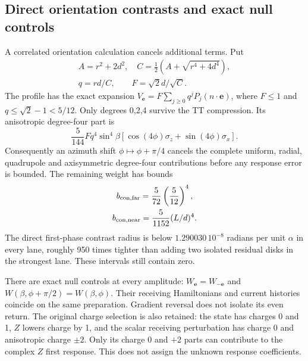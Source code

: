\subsection{Direct orientation contrasts and exact null controls}
A correlated orientation calculation cancels additional terms. Put
\[
 \begin{gathered}
 A=r^2+2d^2,\quad C=\tfrac12(A+\sqrt{r^4+4d^4}),\\
 q=rd/C,\qquad F=\sqrt2d/\sqrt C.
 \end{gathered}
\]
The profile has the exact expansion
$V_{\mathbf e}=F\sum_{j\ge0}q^jP_j(n\cdot\mathbf e)$, where
$F\le1$ and $q\le\sqrt2-1<5/12$. Only degrees 0,2,4 survive the TT
compression. Its anisotropic degree-four part is
\[
 \frac5{144}Fq^4\sin^4\beta
 [\cos(4\phi)\sigma_z+\sin(4\phi)\sigma_x].
\]
Consequently an azimuth shift $\phi\mapsto\phi+\pi/4$ cancels the complete
uniform, radial, quadrupole and axisymmetric degree-four contributions
before any response error is bounded. The remaining weight has bounds
\[
 \begin{gathered}
 b_{{\rm con},\rm far}=\frac5{72}\left(\frac5{12}\right)^4,\\
 b_{{\rm con},\rm near}=\frac5{1152}(L/d)^4.
 \end{gathered}
\]
The direct first-phase contrast radius is below
$1.290030\,10^{-8}$ radians per unit $\alpha$ in every lane, roughly 950
times tighter than adding two isolated residual disks in the strongest
lane. These intervals still contain zero.

There are exact null controls at every amplitude:
$W_{\mathbf e}=W_{-\mathbf e}$ and
$W(\beta,\phi+\pi/2)=W(\beta,\phi)$. Their receiving Hamiltonians and
current histories coincide on the same preparation. Gradient reversal
does not isolate its even return. The original charge selection is also
retained: the state has charges 0 and 1, $Z$ lowers charge by 1, and the
scalar receiving perturbation has charge 0 and anisotropic charge $\pm2$.
Only its charge 0 and $+2$ parts can contribute to the complex $Z$ first
response. This does not assign the unknown response coefficients.


